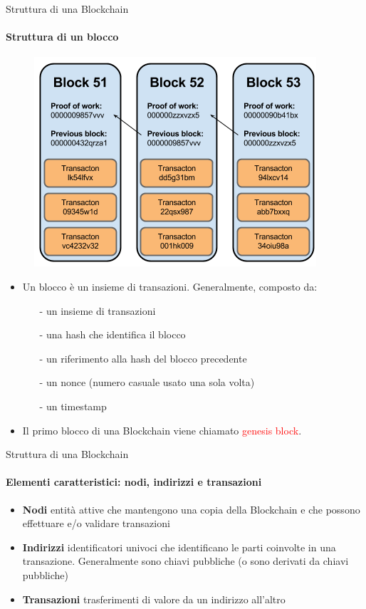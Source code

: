 \documentclass{beamer}
\newcommand\red[1]{\textcolor{red}{#1}}
\begin{document}
  \begin{frame}{Struttura di una Blockchain}
    \framesubtitle{Struttura di un blocco}
        \begin{figure}[!htb]
          \centering
          \includegraphics[width=0.3\linewidth]{../img/blockchain-basic-schema.png}
        \end{figure}
      \begin{itemize}
        \item  Un blocco è un insieme di transazioni. Generalmente, composto da:
        \begin{itemize}
          \item[-] un insieme di transazioni
          \item[-] una hash che identifica il blocco
          \item[-] un riferimento alla hash del blocco precedente
          \item[-] un nonce (numero casuale usato una sola volta)
          \item[-] un timestamp
        \end{itemize}
        \item Il primo blocco di una Blockchain viene chiamato \red{genesis block}.
      \end{itemize}
  \end{frame}




  \begin{frame}{Struttura di una Blockchain}
    \framesubtitle{Elementi caratteristici: nodi, indirizzi e transazioni}
    \begin{itemize}
      \item \textbf{Nodi} entità attive che mantengono una copia della Blockchain e che possono effettuare e/o validare transazioni \pause
      \item \textbf{Indirizzi} identificatori univoci che identificano le parti coinvolte in una transazione. Generalmente sono chiavi pubbliche (o sono derivati da chiavi pubbliche) \pause
      \item \textbf{Transazioni} trasferimenti di valore da un indirizzo all'altro \pause
    \end{itemize}
  \end{frame}
\end{document}

